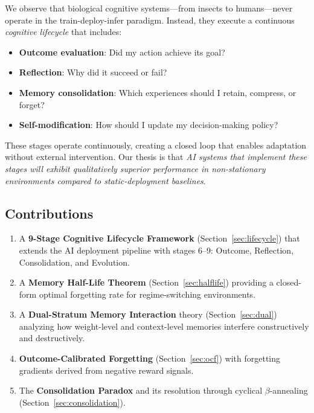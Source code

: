 \documentclass[11pt, a4paper]{article}
\begin{document}
We observe that biological cognitive systems---from insects to humans---never operate in the train-deploy-infer paradigm. Instead, they execute a continuous \emph{cognitive lifecycle} that includes:

\begin{itemize}[leftmargin=*]
  \item \textbf{Outcome evaluation}: Did my action achieve its goal?
  \item \textbf{Reflection}: Why did it succeed or fail?
  \item \textbf{Memory consolidation}: Which experiences should I retain, compress, or forget?
  \item \textbf{Self-modification}: How should I update my decision-making policy?
\end{itemize}

These stages operate continuously, creating a closed loop that enables adaptation without external intervention. Our thesis is that \emph{AI systems that implement these stages will exhibit qualitatively superior performance in non-stationary environments compared to static-deployment baselines}.

\subsection{Contributions}

\begin{enumerate}[leftmargin=*]
  \item A \textbf{9-Stage Cognitive Lifecycle Framework} (Section~\ref{sec:lifecycle}) that extends the AI deployment pipeline with stages 6--9: Outcome, Reflection, Consolidation, and Evolution.
  
  \item A \textbf{Memory Half-Life Theorem} (Section~\ref{sec:halflife}) providing a closed-form optimal forgetting rate for regime-switching environments.
  
  \item A \textbf{Dual-Stratum Memory Interaction} theory (Section~\ref{sec:dual}) analyzing how weight-level and context-level memories interfere constructively and destructively.
  
  \item \textbf{Outcome-Calibrated Forgetting} (Section~\ref{sec:ocf}) with forgetting gradients derived from negative reward signals.
  
  \item The \textbf{Consolidation Paradox} and its resolution through cyclical $\beta$-annealing (Section~\ref{sec:consolidation}).
\end{enumerate}
\end{document}
